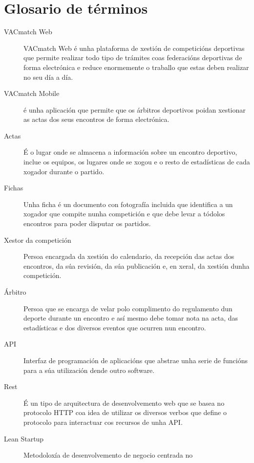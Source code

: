 \chapter{Glosario de términos}
\label{chap:glosario-terminos}


\begin{description}
  \item [VACmatch Web] VACmatch Web é unha plataforma de xestión de 
competicións deportivas que 
permite realizar todo tipo de trámites coas federacións deportivas de forma electrónica e 
reduce enormemente o traballo que estas deben realizar no seu día a día.
  \item [VACmatch Mobile] é unha aplicación que permite que os árbitros deportivos 
poidan xestionar as actas dos seus encontros de forma electrónica.
  \item [Actas] É o lugar onde se almacena a información sobre un encontro 
deportivo, inclue os equipos, os lugares onde se xogou e o resto de estadísticas de cada 
xogador durante o partido.
  \item [Fichas] Unha ficha é un documento con fotografía incluida que identifica a un 
xogador que compite nunha competición e que debe levar a tódolos encontros para poder 
disputar os partidos.
  \item [Xestor da competición] Persoa encargada da xestión do calendario, da recepción 
das actas dos encontros, da súa revisión, da súa publicación e, en xeral, da xestión dunha 
competición.
  \item [Árbitro] Persoa que se encarga de velar polo complimento do regulamento dun 
deporte durante un encontro e así mesmo debe tomar nota na acta, das estadísticas e dos 
diversos eventos que ocurren nun encontro.
 \item [API] Interfaz de programación de aplicacións que abstrae unha serie de 
funcións para a súa utilización dende outro software.
 \item [Rest] É un tipo de arquitectura de desenvolvemento web que se basea 
no protocolo HTTP coa idea de utilizar os diversos verbos que define o 
protocolo para interactuar cos recursos de unha API.
 \item [Lean Startup] Metodoloxía de desenvolvemento de negocio centrada no 

\end{description}
